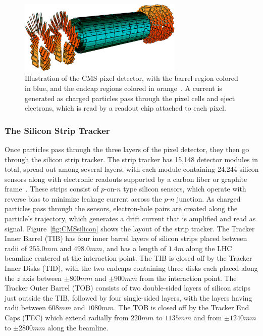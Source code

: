 \begin{figure}[htbp]
  \centering
  \includegraphics[width=0.7\textwidth]{fig/experiment/cms_pixelTracker.pdf}
  \caption[
    Illustration of the CMS pixel detector, with the barrel region colored in blue, and the endcap regions colored in orange.
    A current is generated as charged particles pass through the pixel cells and eject electrons, which is read by a readout chip attached to each pixel.
  ]{
    Illustration of the CMS pixel detector, with the barrel region colored in blue, and the endcap regions colored in orange~\cite{Collaboration_2010_pixel}.
    A current is generated as charged particles pass through the pixel cells and eject electrons, which is read by a readout chip attached to each pixel.
  }
  \label{fig:CMSpixel}
\end{figure}

\subsubsection{The Silicon Strip Tracker}

Once particles pass through the three layers of the pixel detector, they then go through the silicon strip tracker.
The strip tracker has 15,148 detector modules in total, spread out among several layers, with each module containing 24,244 silicon sensors along with electronic readouts supported by a carbon fiber or graphite frame~\cite{TRK-11-001,Phase1Pixel}.
These strips consist of $p$-on-$n$ type silicon sensors, which operate with reverse bias to minimize leakage current across the $p$-$n$ junction.
As charged particles pass through the sensors, electron-hole pairs are created along the particle's trajectory, which generates a drift current that is amplified and read as signal.
Figure~\ref{fig:CMSsilicon} shows the layout of the strip tracker.
The Tracker Inner Barrel (TIB) has four inner barrel layers of silicon strips placed between radii of $255.0\unit{mm}$ and $498.0\unit{mm}$, and has a length of $1.4\unit{m}$ along the LHC beamline centered at the interaction point.
The TIB is closed off by the Tracker Inner Disks (TID), with the two endcaps containing three disks each placed along the $z$ axis between $\pm800\unit{mm}$ and $\pm900\unit{mm}$ from the interaction point.
The Tracker Outer Barrel (TOB) consists of two double-sided layers of silicon strips just outside the TIB, followed by four single-sided layers, with the layers having radii between $608\unit{mm}$ and $1080\unit{mm}$.
The TOB is closed off by the Tracker End Caps (TEC) which extend radially from $220\unit{mm}$ to $1135\unit{mm}$ and from $\pm1240\unit{mm}$ to $\pm2800\unit{mm}$ along the beamline.

